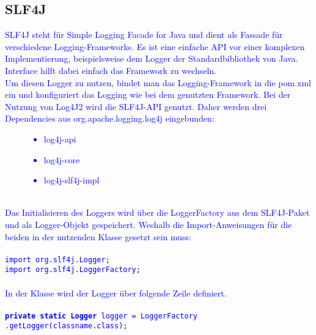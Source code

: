 \subsection{SLF4J}\label{subsec:slf4j}
\textcolor{blue}{
    SLF4J steht für Simple Logging Facade for Java und dient als Fassade für verschiedene Logging-Frameworks.
    Es ist eine einfache API vor einer komplexen Implementierung, beispielsweise dem Logger der Standardbibliothek von Java.
    Interface hilft dabei einfach das Framework zu wechseln.
    \\
    Um diesen Logger zu nutzen, bindet man das Logging-Framework in die pom.xml ein und konfiguriert das Logging wie bei dem genutzten Framework.
    Bei der Nutzung von Log4J2 wird die SLF4J-API genutzt.
    Daher werden drei Dependencies aus org.apache.logging.log4j eingebunden:
    \begin{figure}[h]
        \centering
        \textcolor{blue}{
            \begin{itemize}[noitemsep]
                \item log4j-api
                \item log4j-core
                \item log4j-slf4j-impl
            \end{itemize}\label{fig:figure3}}
    \end{figure}
    \\
    Das Initialisieren des Loggers wird über die LoggerFactory aus dem SLF4J-Paket und als Logger-Objekt gespeichert.
    Weshalb die Import-Anweisungen für die beiden in der nutzenden Klasse gesetzt sein muss:
    \\
    \\
    \hspace*{10mm}
    \texttt{import org.slf4j.Logger;}
    \\
    \hspace*{10mm}
    \texttt{import org.slf4j.LoggerFactory;}
    \\
    \\
    In der Klasse wird der Logger über folgende Zeile definiert.
    \\
    \\
    \hspace*{10mm}
    \texttt{\textbf{private static Logger} logger = LoggerFactory
    \\
    \hspace*{30mm}
    .getLogger(classname.class);}
    \\
    \\
}
